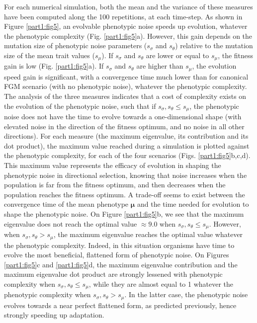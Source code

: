 For each numerical simulation, both the mean and the variance of these measures have been computed along the 100 repetitions, at each time-step. As shown in Figure \ref{part1:fig5}, an evolvable phenotypic noise speeds up evolution, whatever the phenotypic complexity (Fig. \ref{part1:fig5}a). However, this gain depends on the mutation size of phenotypic noise parameters ($s_\sigma$ and $s_\theta$) relative to the mutation size of the mean trait values ($s_\mu$). If $s_\sigma$ and $s_\theta$ are lower or equal to $s_\mu$, the fitness gain is low (Fig. \ref{part1:fig5}a). If $s_\sigma$ and $s_\theta$ are higher than $s_\mu$, the evolution speed gain is significant, with a convergence time much lower than for canonical FGM scenario (with no phenotypic noise), whatever the phenotypic complexity.
The analysis of the three measures indicates that a cost of complexity exists on the evolution of the phenotypic noise, such that if $s_\sigma, s_\theta \leq s_\mu$, the phenotypic noise does not have the time to evolve towards a one-dimensional shape (with elevated noise in the direction of the fitness optimum, and no noise in all other directions). For each measure (the maximum eigenvalue, its contribution and its dot product), the maximum value reached during a simulation is plotted against the phenotypic complexity, for each of the four scenarios (Figs. \ref{part1:fig5}b,c,d). This maximum value represents the efficacy of evolution in shaping the phenotypic noise in directional selection, knowing that noise increases when the population is far from the fitness optimum, and then decreases when the population reaches the fitness optimum.
A trade-off seems to exist between the convergence time of the mean phenotype $\boldsymbol{\mu}$ and the time needed for evolution to shape the phenotypic noise. On Figure \ref{part1:fig5}b, we see that the maximum eigenvalue does not reach the optimal value $\approx 9.0$ when $s_\sigma, s_\theta \leq s_\mu$. However, when $s_\sigma, s_\theta > s_\mu$, the maximum eigenvalue reaches the optimal value whatever the phenotypic complexity. Indeed, in this situation organisms have time to evolve the most beneficial, flattened form of phenotypic noise.
On Figures \ref{part1:fig5}c and \ref{part1:fig5}d, the maximum eigenvalue contribution and the maximum eigenvalue dot product are strongly lessened with phenotypic complexity when $s_\sigma, s_\theta \leq s_\mu$, while they are almost equal to 1 whatever the phenotypic complexity when $s_\sigma, s_\theta > s_\mu$. In the latter case, the phenotypic noise evolves towards a near perfect flattened form, as predicted previously, hence strongly speeding up adaptation.

